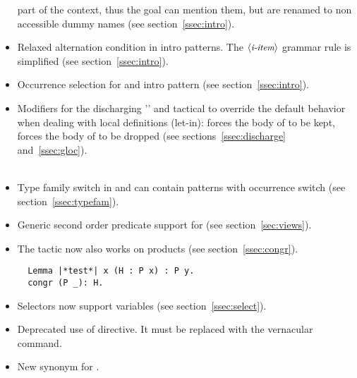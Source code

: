 \begin{itemize}
      part of the context, thus the goal can mention them, but are
      renamed to non accessible dummy names (see section~\ref{ssec:intro}).\\
\item Relaxed alternation condition in intro patterns. The
      $\langle\mbox{\itshape\rmfamily\small i-item}\rangle$ grammar rule is simplified (see section~\ref{ssec:intro}).\\
\item Occurrence selection for \C{->} and \C{<-} intro pattern
       (see section~\ref{ssec:intro}).\\
\item Modifiers for the discharging '\C{:}' and  tactical to override
      the default behavior when dealing with local definitions (let-in):
       forces the body of  to be kept,  forces the body of
       to be dropped  (see sections~\ref{ssec:discharge}
      and~\ref{ssec:gloc}).\\
      \\
\item Type family switch in  and 
      can contain patterns with occurrence switch
      (see section~\ref{ssec:typefam}).\\
\item Generic second order predicate support for 
      (see section~\ref{sec:views}).\\
\item The  tactic now also works on products (see
      section~\ref{ssec:congr}).
\begin{lstlisting}
  Lemma |*test*| x (H : P x) : P y.
  congr (P _): H.
\end{lstlisting}
\item Selectors now support \Ltac{} variables
      (see section~\ref{ssec:select}).\\
\item Deprecated use of  directive.
      It must be replaced with the \Coq{}  vernacular command.
\item New synonym  for .
\end{itemize}
